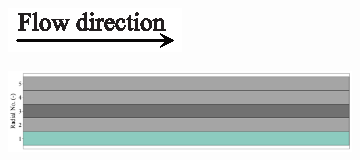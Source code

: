 \documentclass[preprint,12pt]{elsarticle}
\begin{document}
\begin{figure}
     \centering
     \begin{subfigure}[b]{\textwidth}
     	\includegraphics[width=\textwidth]{flow_dir.eps}
     \end{subfigure}
     \begin{subfigure}[b]{0.85\textwidth}
\includegraphics[width=\textwidth]{results/segments/5seg/80C20T/seg.png}
     \end{subfigure}
     \hfill
     \begin{subfigure}[b]{0.1\textwidth}

\end{subfigure}
\end{figure}
\end{document}
